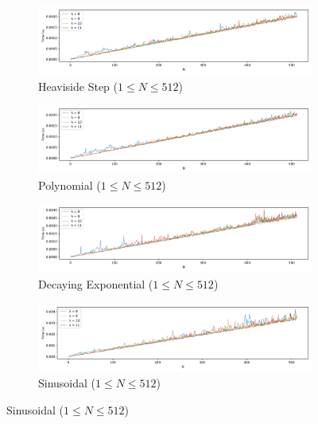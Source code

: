 \documentclass[a4paper]{report}
\begin{document}
\begin{figure}[H]
    \begin{subfigure}{1\linewidth}
      \includegraphics[width=\linewidth]{images/abate_whitt/heaviside_step_speeds.png}
      \caption{Heaviside Step ($1 \leq N \leq 512$)}
    \end{subfigure}
    
    \medskip
    
    \begin{subfigure}{1\linewidth}
      \includegraphics[width=\linewidth]{images/abate_whitt/polynomial_speeds.png}
      \caption{Polynomial ($1 \leq N \leq 512$)}
    \end{subfigure}
    
    \medskip
    
    \begin{subfigure}{1\linewidth}
      \includegraphics[width=\linewidth]{images/abate_whitt/decay_exp_speeds.png}
      \caption{Decaying Exponential ($1 \leq N \leq 512$)}
    \end{subfigure}
    
    \medskip
    
    \begin{subfigure}{1\linewidth}
      \includegraphics[width=\linewidth]{images/abate_whitt/sinusoidal_speeds.png}
      \caption{Sinusoidal ($1 \leq N \leq 512$)}
    \end{subfigure}
    

\end{figure}
\end{document}
